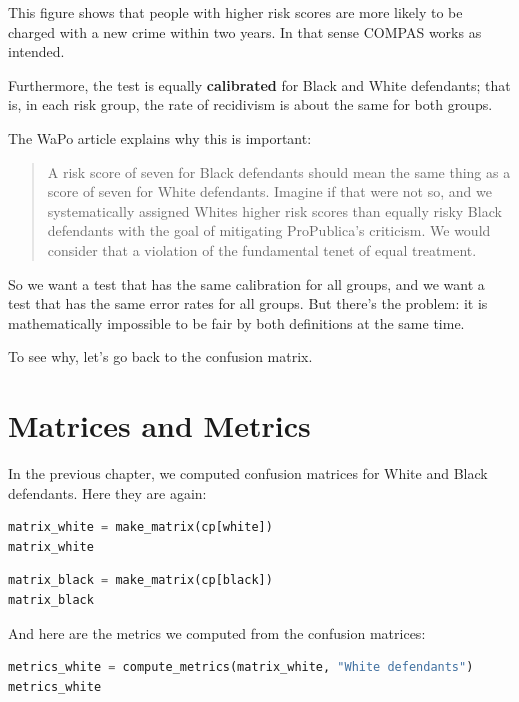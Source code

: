 This figure shows that people with higher risk scores are more likely to
be charged with a new crime within two years. In that sense COMPAS works
as intended.

Furthermore, the test is equally \textbf{calibrated} for Black and White
defendants; that is, in each risk group, the rate of recidivism is about
the same for both groups.

The WaPo article explains why this is important:

\begin{quote}
A risk score of seven for Black defendants should mean the same thing as
a score of seven for White defendants. Imagine if that were not so, and
we systematically assigned Whites higher risk scores than equally risky
Black defendants with the goal of mitigating ProPublica's criticism. We
would consider that a violation of the fundamental tenet of equal
treatment.
\end{quote}

So we want a test that has the same calibration for all groups, and we
want a test that has the same error rates for all groups. But there's
the problem: it is mathematically impossible to be fair by both
definitions at the same time.

To see why, let's go back to the confusion matrix.

\hypertarget{matrices-and-metrics}{%
\section{Matrices and Metrics}\label{matrices-and-metrics}}

In the previous chapter, we computed confusion matrices for White and
Black defendants. Here they are again:

\begin{lstlisting}[language=Python,style=source]
matrix_white = make_matrix(cp[white])
matrix_white
\end{lstlisting}

\begin{lstlisting}[language=Python,style=source]
matrix_black = make_matrix(cp[black])
matrix_black
\end{lstlisting}

And here are the metrics we computed from the confusion matrices:

\begin{lstlisting}[language=Python,style=source]
metrics_white = compute_metrics(matrix_white, "White defendants")
metrics_white
\end{lstlisting}

